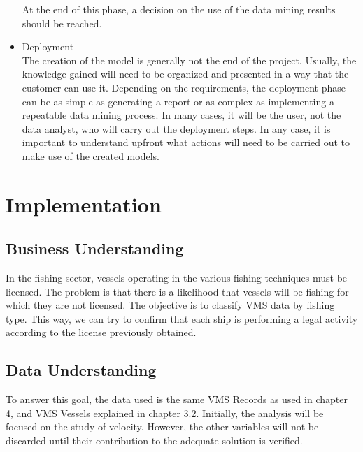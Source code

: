 \begin{itemize}
At the end of this phase, a decision on the use of the data mining results should be reached.
\item Deployment\\
The creation of the model is generally not the end of the project. Usually, the knowledge gained
will need to be organized and presented in a way that the customer can use it. Depending on
the requirements, the deployment phase can be as simple as generating a report or as complex
as implementing a repeatable data mining process. In many cases, it will be the user, not the
data analyst, who will carry out the deployment steps. In any case, it is important to
understand upfront what actions will need to be carried out to make use of
the created models.
\end{itemize}

\section{Implementation} %
\label{sub:implementation}

\subsection{Business Understanding} %
\label{sub:business_understanding}

In the fishing sector, vessels operating in the various fishing techniques must be licensed.
The problem is that there is a likelihood that vessels will be fishing for which they are not licensed. The objective is to classify VMS data by fishing type. This way, we can try to confirm that each ship is performing a legal activity according to the license previously obtained.





\subsection{Data Understanding} %
\label{sub:data_understanding}

To answer this goal, the data used is the same VMS Records as used in chapter 4, and VMS Vessels explained in chapter 3.2.
Initially, the analysis will be focused on the study of velocity. However, the other variables will not be discarded until their contribution to the adequate solution is verified.




